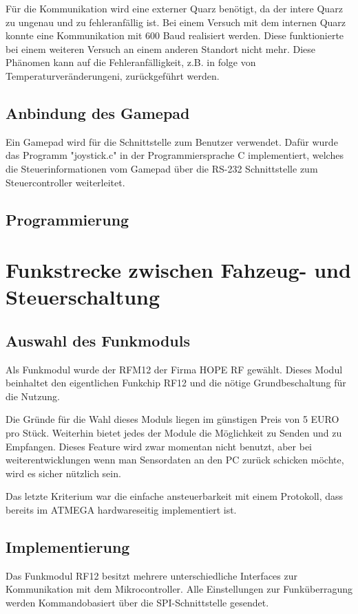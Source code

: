 \documentclass{scrartcl}
\begin{document}
		Für die Kommunikation wird eine externer Quarz benötigt, da der intere Quarz zu ungenau und zu fehleranfällig ist.
		Bei einem Versuch mit dem internen Quarz konnte eine Kommunikation mit 600 Baud realisiert werden.
		Diese funktionierte bei einem weiteren Versuch an einem anderen Standort nicht mehr.
		Diese Phänomen kann auf die Fehleranfälligkeit, z.B. in folge von Temperaturveränderungeni, zurückgeführt werden.

	\subsection{Anbindung des Gamepad} %
		Ein Gamepad wird für die Schnittstelle zum Benutzer verwendet.
		Dafür wurde das Programm "joystick.c" in der Programmiersprache C implementiert,
		welches die Steuerinformationen vom Gamepad über die RS-232 Schnittstelle zum Steuercontroller weiterleitet.
	
	\subsection{Programmierung} %
\newpage
\section{Funkstrecke zwischen Fahzeug- und Steuerschaltung} %
	\subsection{Auswahl des Funkmoduls}
		Als Funkmodul wurde der RFM12 der Firma HOPE RF gewählt.
		Dieses Modul beinhaltet den eigentlichen Funkchip RF12 und die nötige Grundbeschaltung für die Nutzung.

		Die Gründe für die Wahl dieses Moduls liegen im günstigen Preis von 5 EURO pro Stück.
		Weiterhin bietet jedes der Module die Möglichkeit zu Senden und zu Empfangen.
		Dieses Feature wird zwar momentan nicht benutzt, aber bei weiterentwicklungen wenn man Sensordaten
		an den PC zurück schicken möchte, wird es sicher nützlich sein.
		
		Das letzte Kriterium war die einfache ansteuerbarkeit mit einem Protokoll, dass bereits im ATMEGA 
		hardwareseitig implementiert ist.
	\subsection{Implementierung}
		Das Funkmodul RF12 besitzt mehrere unterschiedliche Interfaces 
		zur Kommunikation mit dem Mikrocontroller.
		Alle Einstellungen zur Funküberragung werden Kommandobasiert
		über die SPI-Schnittstelle gesendet.
\end{document}
